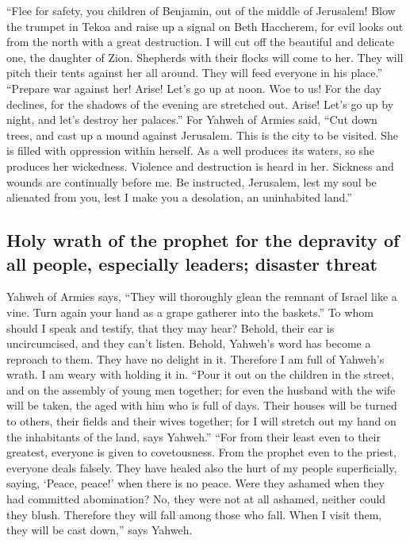  ``Flee for safety, you children of Benjamin, out of the
middle of Jerusalem! Blow the trumpet in Tekoa and raise up a signal on
Beth Haccherem, for evil looks out from the north with a great
destruction.  I will cut off the beautiful and delicate
one, the daughter of Zion.  Shepherds with their flocks
will come to her. They will pitch their tents against her all around.
They will feed everyone in his place.''  ``Prepare war
against her! Arise! Let's go up at noon. Woe to us! For the day
declines, for the shadows of the evening are stretched out.
 Arise! Let's go up by night, and let's destroy her
palaces.''  For Yahweh of Armies said, ``Cut down trees,
and cast up a mound against Jerusalem. This is the city to be visited.
She is filled with oppression within herself.  As a well
produces its waters, so she produces her wickedness. Violence and
destruction is heard in her. Sickness and wounds are continually before
me.  Be instructed, Jerusalem, lest my soul be alienated
from you, lest I make you a desolation, an uninhabited land.''

\hypertarget{holy-wrath-of-the-prophet-for-the-depravity-of-all-people-especially-leaders-disaster-threat}{%
\subsection{Holy wrath of the prophet for the depravity of all people,
especially leaders; disaster
threat}\label{holy-wrath-of-the-prophet-for-the-depravity-of-all-people-especially-leaders-disaster-threat}}

 Yahweh of Armies says, ``They will thoroughly glean the
remnant of Israel like a vine. Turn again your hand as a grape gatherer
into the baskets.''  To whom should I speak and testify,
that they may hear? Behold, their ear is uncircumcised, and they can't
listen. Behold, Yahweh's word has become a reproach to them. They have
no delight in it.  Therefore I am full of Yahweh's wrath.
I am weary with holding it in. ``Pour it out on the children in the
street, and on the assembly of young men together; for even the husband
with the wife will be taken, the aged with him who is full of days.
 Their houses will be turned to others, their fields and
their wives together; for I will stretch out my hand on the inhabitants
of the land, says Yahweh.''  ``For from their least even
to their greatest, everyone is given to covetousness. From the prophet
even to the priest, everyone deals falsely.  They have
healed also the hurt of my people superficially, saying, `Peace, peace!'
when there is no peace.  Were they ashamed when they had
committed abomination? No, they were not at all ashamed, neither could
they blush. Therefore they will fall among those who fall. When I visit
them, they will be cast down,'' says Yahweh.

